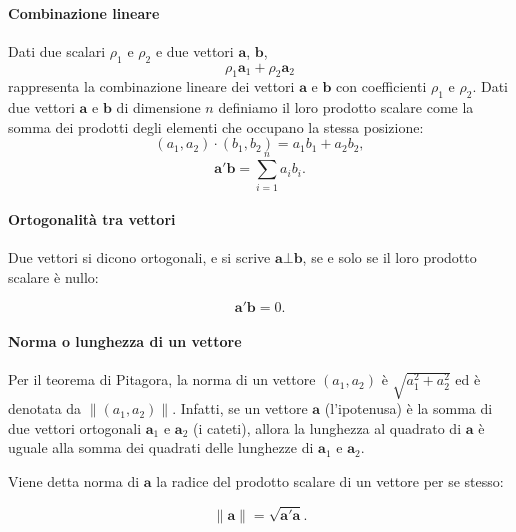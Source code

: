 \paragraph{Combinazione lineare}

Dati due scalari $\rho_1$ e $\rho_2$ e due vettori $\boldsymbol{a}$, $\boldsymbol{b}$,
 $$
\rho_1 \boldsymbol{a}_1 + \rho_2 \boldsymbol{a}_2
 $$
rappresenta la combinazione lineare dei vettori
$\boldsymbol{a}$ e $\boldsymbol{b}$  con coefficienti $\rho_1$ e
$\rho_2$.
Dati due vettori $\boldsymbol{a}$ e $\boldsymbol{b}$ di dimensione
$n$ definiamo il loro prodotto scalare come la somma dei
prodotti degli elementi che occupano la stessa posizione:
\begin{displaymath}
(a_1, a_2) \cdot (b_1, b_2) = a_1 b_1 + a_2 b_2,
\end{displaymath}
$$
\boldsymbol{a}'\boldsymbol{b} = \sum_{i=1}^{n}a_i b_i.
$$


\paragraph{Ortogonalit{\`a} tra vettori}

Due vettori si dicono ortogonali, e si scrive $\boldsymbol{a}
 \bot \boldsymbol{b}$, se e solo se il loro prodotto scalare {\`e}
nullo:

$$\boldsymbol{a}'\boldsymbol{b} = 0.$$

\paragraph{Norma o lunghezza di un vettore}

Per il teorema di Pitagora, la norma di un vettore $(a_1,
a_2)$ {\`e} $\sqrt{a_1^2 + a_2^2}$ ed {\`e} denotata da $\| (a_1,
a_2) \|$.
Infatti, se un vettore $\boldsymbol{a}$ (l'ipotenusa) {\`e} la somma di
due vettori ortogonali $\boldsymbol{a}_1$ e $\boldsymbol{a}_2$ (i
cateti), allora la lunghezza al quadrato di $\boldsymbol{a}$ {\`e}
uguale alla somma dei quadrati delle lunghezze di
$\boldsymbol{a}_1$ e $\boldsymbol{a}_2$.

Viene detta norma di $\boldsymbol{a}$ la radice del prodotto
scalare di un vettore per se stesso:

$$
\| \boldsymbol{a} \| = \sqrt{\boldsymbol{a}'\boldsymbol{a}}.
$$


